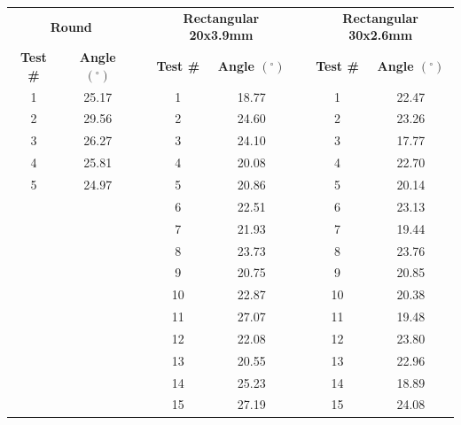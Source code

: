 \begin{table}[ht!]
\centering
\begin{adjustbox}{max width = 0.6\linewidth}
\begin{tabular}{lll|c|c|c|c|c|}
\cline{1-2} \cline{4-5} \cline{7-8}
\multicolumn{2}{|c|}{\textbf{Round}} &  & \multicolumn{2}{c|}{\textbf{Rectangular 20x3.9mm}} &  & \multicolumn{2}{c|}{\textbf{Rectangular 30x2.6mm}} \\ \cline{1-2} \cline{4-5} \cline{7-8} 
\multicolumn{1}{|c|}{\textbf{Test \#}} & \multicolumn{1}{c|}{\textbf{Angle $(^\circ)$}} &  & \textbf{Test \#} & \textbf{Angle $(^\circ)$} &  & \textbf{Test \#} & \textbf{Angle $(^\circ)$} \\ \cline{1-2} \cline{4-5} \cline{7-8}
\multicolumn{1}{|c|}{1} & \multicolumn{1}{c|}{25.17} &  & 1 & 18.77 &  & 1 & 22.47 \\ \cline{1-2} \cline{4-5} \cline{7-8} 
\multicolumn{1}{|c|}{2} & \multicolumn{1}{c|}{29.56} &  & 2 & 24.60 &  & 2 & 23.26 \\ \cline{1-2} \cline{4-5} \cline{7-8} 
\multicolumn{1}{|c|}{3} & \multicolumn{1}{c|}{26.27} &  & 3 & 24.10 &  & 3 & 17.77 \\ \cline{1-2} \cline{4-5} \cline{7-8} 
\multicolumn{1}{|c|}{4} & \multicolumn{1}{c|}{25.81} &  & 4 & 20.08 &  & 4 & 22.70 \\ \cline{1-2} \cline{4-5} \cline{7-8} 
\multicolumn{1}{|c|}{5} & \multicolumn{1}{c|}{24.97} &  & 5 & 20.86 &  & 5 & 20.14 \\ \cline{1-2} \cline{4-5} \cline{7-8} 
 &  &  & 6 & 22.51 &  & 6 & 23.13 \\ \cline{4-5} \cline{7-8} 
 &  &  & 7 & 21.93 &  & 7 & 19.44 \\ \cline{4-5} \cline{7-8} 
 &  &  & 8 & 23.73 &  & 8 & 23.76 \\ \cline{4-5} \cline{7-8} 
 &  &  & 9 & 20.75 &  & 9 & 20.85 \\ \cline{4-5} \cline{7-8} 
 &  &  & 10 & 22.87 &  & 10 & 20.38 \\ \cline{4-5} \cline{7-8} 
 &  &  & 11 & 27.07 &  & 11 & 19.48 \\ \cline{4-5} \cline{7-8} 
 &  &  & 12 & 22.08 &  & 12 & 23.80 \\ \cline{4-5} \cline{7-8} 
 &  &  & 13 & 20.55 &  & 13 & 22.96 \\ \cline{4-5} \cline{7-8} 
 &  &  & 14 & 25.23 &  & 14 & 18.89 \\ \cline{4-5} \cline{7-8} 
 &  &  & 15 & 27.19 &  & 15 & 24.08 \\ \cline{4-5} \cline{7-8} 

\end{tabular}
\end{adjustbox}
\end{table}

